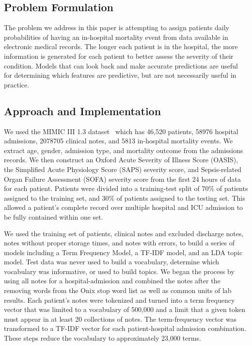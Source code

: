 \documentclass[journal]{IEEEtran}
\begin{document}
\subsection{Problem Formulation}

The problem we address in this paper is attempting to assign patients daily probabilities of having an in-hospital mortality event from data available in electronic medical records.   The longer each patient is in the hospital, the more information is generated for each patient to better assess the severity of their condition.  Models that can look back and make accurate predictions are useful for determining which features are predictive, but are not necessarily useful in practice. 

\subsection{Approach and Implementation}

We used the MIMIC III 1.3 dataset~\cite{saeed_multiparameter_2011} which has 46,520 patients, 58976 hospital admissions, 2078705 clinical notes, and 5813 in-hospital mortality events.  We extract age, gender, admission type, and mortality outcome from the admissions records.  We then construct an  Oxford Acute Severity of Illness Score (OASIS), the Simplified Acute Physiology Score (SAPS) severity score, and Sepsis-related Organ Failure Assessment (SOFA) severity score from the first 24 hours of data for each patient.  Patients were divided into a training-test split of 70\% of patients assigned to the training set, and 30\% of patients assigned to the testing set.  This allowed a patient's complete record over multiple hospital and ICU admission to be fully contained within one set.  

We used the training set of patients, clinical notes and excluded discharge notes, notes without proper storage times, and notes with errors, to build a series of models including a Term Frequency Model, a TF-IDF model, and an LDA topic model.   Test data was never used to build a vocabulary, determine which vocabulary was informative, or used to build topics.  We began the process by using all notes for a hospital-admission and combined the notes after the removing words from the Onix stop word list as well as common units of lab results.   Each patient's notes were tokenized and turned into a term frequency vector that was limited to a vocabulary of 500,000 and a limit that a given token must appear in at least 20 collections of notes.   The term-frequency vector was transformed to a TF-IDF vector for each patient-hospital admission combination.  These steps reduce the vocabulary to approximately 23,000 terms.
\end{document}
